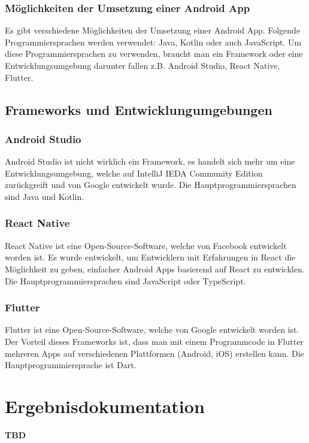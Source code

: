 \subsection{Möglichkeiten der Umsetzung einer Android App}
Es gibt verschiedene Möglichkeiten der Umsetzung einer Android App. Folgende Programmiersprachen werden verwendet: Java, Kotlin oder auch JavaScript. Um diese Programmiersprachen zu verwenden, braucht man ein Framework oder eine Entwicklungsumgebung darunter fallen z.B. Android Studio, React Native, Flutter.

\section{Frameworks und Entwicklungumgebungen}
\subsection{Android Studio}
Android Studio ist nicht wirklich ein Framework, es handelt sich mehr um eine Entwicklungsumgebung, welche auf IntelliJ IEDA Community Edition zurückgreift und von Google entwickelt wurde. Die Hauptprogrammiersprachen sind Java und Kotlin.\\
 \cite{Android Studio}

\subsection{React Native}
React Native ist eine Open-Source-Software, welche von Facebook entwickelt worden ist. Es wurde entwickelt, um Entwicklern mit Erfahrungen in React die Möglichkeit zu geben, einfacher Android Apps basierend auf React zu entwicklen. Die Hauptprogrammiersprachen sind JavaScript oder TypeScript.\\
\cite{React Native}

\subsection{Flutter}
Flutter ist eine Open-Source-Software, welche von Google entwickelt worden ist. Der Vorteil dieses Frameworks ist, dass man mit einem Programmcode in Flutter mehreren Apps auf verschiedenen Plattformen (Android, iOS) erstellen kann. Die Hauptprogrammiersprache ist Dart.\\
\cite{Flutter}


\chapter{Ergebnisdokumentation}
\textbf{TBD}


